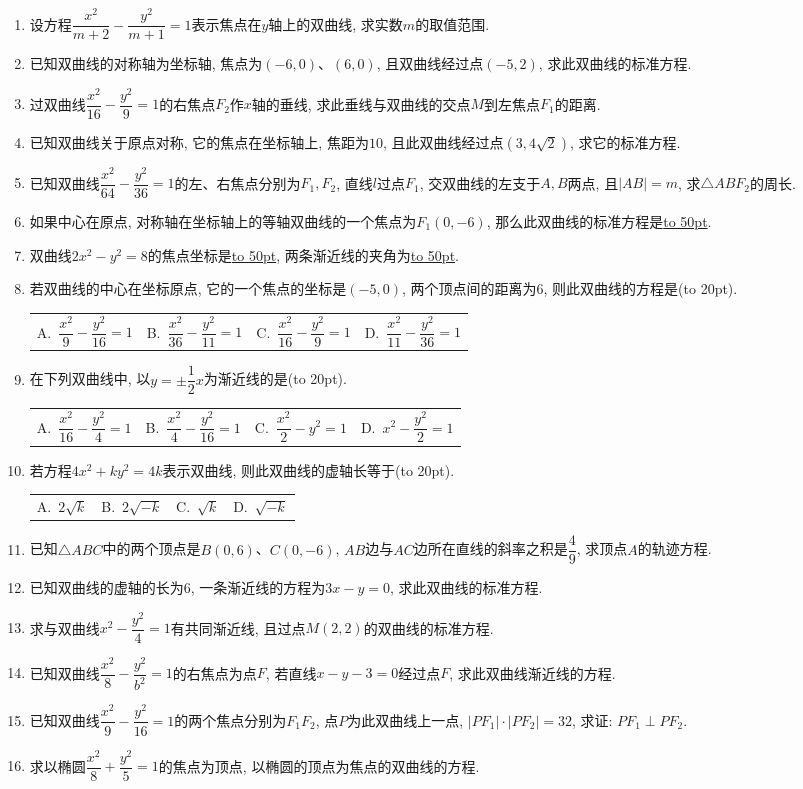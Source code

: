 \documentclass[10pt,a4paper]{article}
\newcommand{\blank}[1]{\underline{\hbox to #1pt{}}}
\newcommand{\bracket}[1]{(\hbox to #1pt{})}
\newcommand{\fourch}[4]{\par\begin{tabular}{p{.23\textwidth}p{.23\textwidth}p{.23\textwidth}p{.23\textwidth}}
A.~#1 &B.~#2& C.~#3& D.~#4
\end{tabular}}
\begin{document}
\begin{enumerate}[1.]
\item 设方程$\dfrac{x^2}{m+2}-\dfrac{y^2}{m+1}=1$表示焦点在$y$轴上的双曲线, 求实数$m$的取值范围.
\item 已知双曲线的对称轴为坐标轴, 焦点为$(-6,0)$、$(6,0)$, 且双曲线经过点$(-5,2)$, 求此双曲线的标准方程.
\item 过双曲线$\dfrac{x^2}{16}-\dfrac{y^2}9=1$的右焦点$F_2$作$x$轴的垂线, 求此垂线与双曲线的交点$M$到左焦点$F_1$的距离.
\item 已知双曲线关于原点对称, 它的焦点在坐标轴上, 焦距为$10$, 且此双曲线经过点$(3,4\sqrt 2)$, 求它的标准方程.
\item 已知双曲线$\dfrac{x^2}{64}-\dfrac{y^2}{36}=1$的左、右焦点分别为$F_1,F_2$, 直线$l$过点$F_1$, 交双曲线的左支于$A,B$两点, 且$|AB|=m$, 求$\triangle ABF_2$的周长.
\item 如果中心在原点, 对称轴在坐标轴上的等轴双曲线的一个焦点为$F_1(0,-6)$, 那么此双曲线的标准方程是\blank{50}.
\item 双曲线$2x^2-y^2=8$的焦点坐标是\blank{50}, 两条渐近线的夹角为\blank{50}.
\item 若双曲线的中心在坐标原点, 它的一个焦点的坐标是$(-5,0)$, 两个顶点间的距离为$6$, 则此双曲线的方程是\bracket{20}.
\fourch{$\dfrac{x^2}9-\dfrac{y^2}{16}=1$}{$\dfrac{x^2}{36}-\dfrac{y^2}{11}=1$}{$\dfrac{x^2}{16}-\dfrac{y^2}9=1$}{$\dfrac{x^2}{11}-\dfrac{y^2}{36}=1$}
\item 在下列双曲线中, 以$y=\pm \dfrac 12x$为渐近线的是\bracket{20}.
\fourch{$\dfrac{x^2}{16}-\dfrac{y^2}4=1$}{$\dfrac{x^2}4-\dfrac{y^2}{16}=1$}{$\dfrac{x^2}2-y^2=1$}{$x^2-\dfrac{y^2}2=1$}
\item 若方程$4x^2+ky^2=4k$表示双曲线, 则此双曲线的虚轴长等于\bracket{20}.
\fourch{$2\sqrt k$}{$2\sqrt {-k}$}{$\sqrt k$}{$\sqrt {-k}$}
\item 已知$\triangle ABC$中的两个顶点是$B(0,6)$、$C(0,-6)$, $AB$边与$AC$边所在直线的斜率之积是$\dfrac 49$, 求顶点$A$的轨迹方程.
\item 已知双曲线的虚轴的长为$6$, 一条渐近线的方程为$3x-y=0$, 求此双曲线的标准方程.
\item 求与双曲线$x^2-\dfrac{y^2}4=1$有共同渐近线, 且过点$M(2,2)$的双曲线的标准方程.
\item 已知双曲线$\dfrac{x^2}8-\dfrac{y^2}{b^2}=1$的右焦点为点$F$, 若直线$x-y-3=0$经过点$F$, 求此双曲线渐近线的方程.
\item 已知双曲线$\dfrac{x^2}9-\dfrac{y^2}{16}=1$的两个焦点分别为$F_1F_2$, 点$P$为此双曲线上一点, $|PF_1|\cdot|PF_2|=32$, 求证: $PF_1\perp PF_2$.
\item 求以椭圆$\dfrac{x^2}8+\dfrac{y^2}5=1$的焦点为顶点, 以椭圆的顶点为焦点的双曲线的方程.

\end{enumerate}
\end{document}
